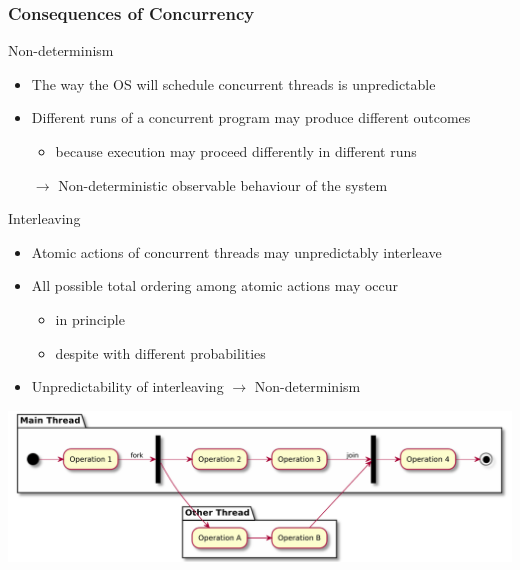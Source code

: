 \documentclass[presentation]{beamer}\mode<presentation>{\usetheme{AMSBolognaFC}}
\begin{document}
\begin{frame}[allowframebreaks]
    \frametitle{Consequences of Concurrency}

    \begin{block}{Non-determinism}
        \begin{itemize}
            \item The way the OS will schedule concurrent threads is unpredictable
            \item Different runs of a concurrent program may produce different outcomes
            \begin{itemize}
                \item because execution may proceed differently in different runs
            \end{itemize}
            \item[$\rightarrow$] Non-deterministic observable behaviour of the system
        \end{itemize}
    \end{block}

    \begin{block}{Interleaving}
        \begin{itemize}
            \item \alert{Atomic} actions of concurrent threads may unpredictably \alert{interleave}
            \item All possible total ordering among atomic actions may occur
            \begin{itemize}
                \item in principle
                \item despite with different probabilities
            \end{itemize}
            \item Unpredictability of interleaving $\rightarrow$ Non-determinism
        \end{itemize}
    \end{block}

    \framebreak

    \begin{center}
        \includegraphics[width=\linewidth]{img/fork-join.pdf}
    \end{center}


\end{frame}
\end{document}
